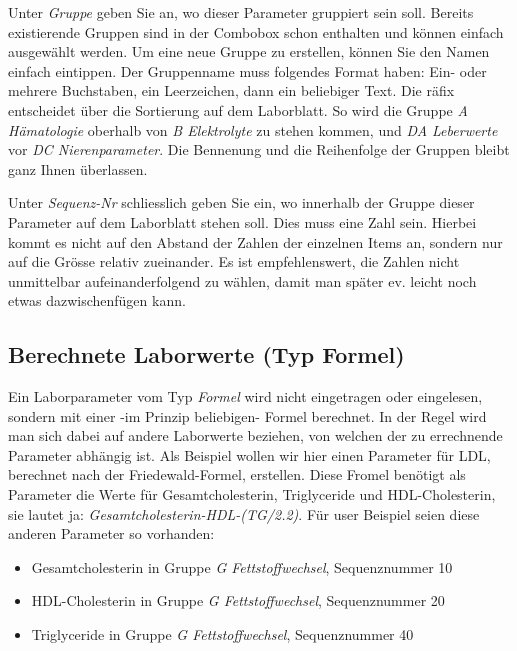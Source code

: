 Unter \textit{Gruppe} geben Sie an, wo dieser Parameter gruppiert sein soll. Bereits existierende Gruppen sind in der Combobox schon enthalten und können einfach ausgewählt werden. Um eine neue Gruppe zu erstellen, können Sie den Namen einfach eintippen. Der Gruppenname muss folgendes Format haben:
Ein- oder mehrere Buchstaben, ein Leerzeichen, dann ein beliebiger Text. Die räfix entscheidet über die Sortierung auf dem Laborblatt. So wird die Gruppe  \textit{A Hämatologie} oberhalb von \textit{B Elektrolyte} zu stehen kommen, und \textit{DA Leberwerte} vor \textit{DC Nierenparameter}. Die Bennenung und die Reihenfolge der Gruppen bleibt ganz Ihnen überlassen.

Unter \textit{Sequenz-Nr} schliesslich geben Sie ein, wo innerhalb der Gruppe dieser Parameter auf dem Laborblatt stehen soll. Dies muss eine Zahl sein. Hierbei kommt es nicht auf den Abstand der Zahlen der einzelnen Items an, sondern nur auf die Grösse relativ zueinander. Es ist empfehlenswert, die Zahlen nicht unmittelbar aufeinanderfolgend zu wählen, damit man später ev. leicht noch etwas dazwischenfügen kann.

\subsection{Berechnete Laborwerte (Typ Formel)}
\label{ref:formel}
Ein Laborparameter vom Typ \textit{Formel} wird nicht eingetragen oder eingelesen, sondern mit einer -im Prinzip beliebigen- Formel berechnet. In der Regel wird man sich dabei auf andere Laborwerte beziehen, von welchen der zu errechnende Parameter abhängig ist. Als Beispiel wollen wir hier einen Parameter für LDL, berechnet nach der Friedewald-Formel, erstellen. Diese Fromel benötigt als Parameter die Werte für Gesamtcholesterin, Triglyceride und HDL-Cholesterin, sie lautet ja: \textit{Gesamtcholesterin-HDL-(TG/2.2)}. Für user Beispiel seien diese anderen Parameter so vorhanden:
\begin{itemize}
  \item Gesamtcholesterin in Gruppe \textit{G Fettstoffwechsel}, Sequenznummer 10
  \item HDL-Cholesterin in Gruppe \textit{G Fettstoffwechsel}, Sequenznummer 20
  \item Triglyceride in Gruppe \textit{G Fettstoffwechsel}, Sequenznummer 40
\end{itemize}

